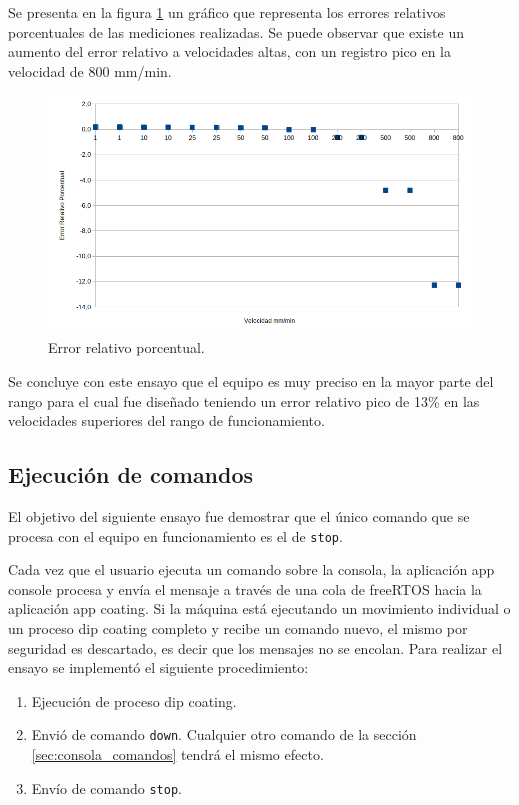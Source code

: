 Se presenta en la figura \ref{fig:error_porcentual_1} un gráfico que representa los errores relativos porcentuales de las mediciones realizadas. Se puede observar que existe un aumento del error relativo a velocidades altas, con un registro pico  en la velocidad de 800 mm/min. 


\begin{figure}[h!]
\centering 
\includegraphics[width=1\textwidth]{./Figures/error.png}
\caption{Error relativo porcentual.}
\label{fig:error_porcentual_1}
\end{figure}
Se concluye con este ensayo que el equipo es muy preciso en la mayor parte del rango para el cual fue diseñado teniendo un error relativo pico de 13\% en las velocidades superiores del rango de funcionamiento.
 
 
\subsection{Ejecución de comandos}

El objetivo del siguiente ensayo fue demostrar que el único comando que se procesa con el equipo en funcionamiento es el de \texttt{stop}.

Cada vez que el usuario ejecuta un comando sobre la consola, la aplicación app console procesa y envía el mensaje a través de una cola de freeRTOS hacia la aplicación app coating. Si la máquina está ejecutando un movimiento individual o un proceso dip coating completo y recibe un comando nuevo, el mismo por seguridad es descartado, es decir que los mensajes no se encolan. 
Para realizar el ensayo se implementó el siguiente procedimiento:
\begin{enumerate}
\item Ejecución de proceso  dip coating.
\item Envió de comando \texttt{down}. Cualquier otro comando de la sección \ref{sec:consola_comandos} tendrá el mismo efecto.
\item Envío de comando \texttt{stop}.
\end{enumerate}

